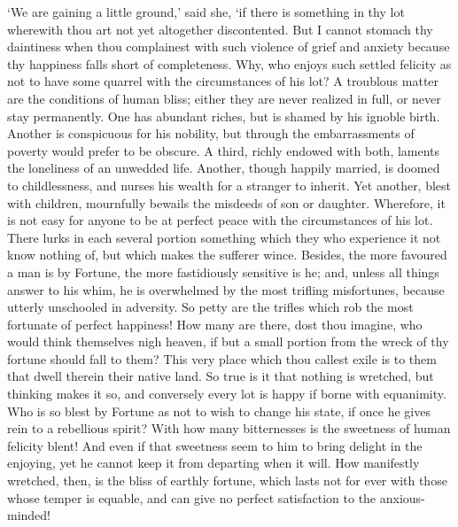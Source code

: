 \documentclass[11pt]{book}
\begin{document}
`We are gaining a little ground,' said she, `if there is something in
thy lot wherewith thou art not yet altogether discontented. But I cannot
stomach thy daintiness when thou complainest with such violence of grief
and anxiety because thy happiness falls short of completeness. Why, who
enjoys such settled felicity as not to have some quarrel with the
circumstances of his lot? A troublous matter are the conditions of human
bliss; either they are never realized in full, or never stay
permanently. One has abundant riches, but is shamed by his ignoble
birth. Another is conspicuous for his nobility, but through the
embarrassments of poverty would prefer to be obscure. A third, richly
endowed with both, laments the loneliness of an unwedded life. Another,
though happily married, is doomed to childlessness, and nurses his
wealth for a stranger to inherit. Yet another, blest with children,
mournfully bewails the misdeeds of son or daughter. Wherefore, it is not
easy for anyone to be at perfect peace with the circumstances of his
lot. There lurks in each several portion something which they who
experience it not know nothing of, but which makes the sufferer wince.
Besides, the more favoured a man is by Fortune, the more fastidiously
sensitive is he; and, unless all things answer to his whim, he is
overwhelmed by the most trifling misfortunes, because utterly unschooled
in adversity. So petty are the trifles which rob the most fortunate of
perfect happiness! How many are there, dost thou imagine, who would
think themselves nigh heaven, if but a small portion from the wreck of
thy fortune should fall to them? This very place which thou callest
exile is to them that dwell therein their native land. So true is it
that nothing is wretched, but thinking makes it so, and conversely every
lot is happy if borne with equanimity. Who is so blest by Fortune as not
to wish to change his state, if once he gives rein to a rebellious
spirit? With how many bitternesses is the sweetness of human felicity
blent! And even if that sweetness seem to him to bring delight in the
enjoying, yet he cannot keep it from departing when it will. How
manifestly wretched, then, is the bliss of earthly fortune, which lasts
not for ever with those whose temper is equable, and can give no perfect
satisfaction to the anxious-minded!
\end{document}
